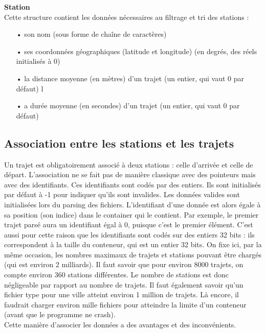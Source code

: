 \documentclass[12pt]{article}
\begin{document}
		\textbf{Station}\\
		Cette structure contient les données nécessaires au filtrage et tri des stations :\\
		\begin{itemize}
			\item[•]son nom (sous forme de chaîne de caractères)
			\item[•]ses coordonnées géographiques (latitude et longitude) (en degrés,
			des réels initialisés à 0)
			\item[•]la distance moyenne (en mètres) d’un trajet (un entier, qui vaut 0 par défaut)
			l\item[•]a durée moyenne (en secondes) d’un trajet (un entier, qui vaut 0 par défaut)
		\end{itemize}
			
		\subsection{Association entre les stations et les trajets}
		Un trajet est obligatoirement associé à deux stations : celle d’arrivée et celle de départ.
	L’association ne se fait pas de manière classique avec des pointeurs mais avec des identifiants. Ces identifiants sont codés par des entiers. Ils sont initialisés par défaut à -1 pour indiquer qu’ils sont invalides. Les données valides sont initialisées lors du parsing des fichiers. L’identifiant d’une donnée est alors égale à sa position (son indice) dans le container qui le contient. Par exemple, le premier trajet parsé aura un identifiant égal à 0, puisque c’est le premier élément. C’est aussi pour cette raison que les identifiants sont codés sur des entiers 32 bits : ils correspondent à la taille du conteneur, qui est un entier 32 bits. On fixe ici, par la même occasion, les nombres maximaux de trajets et stations pouvant être chargés (qui est environ 2 milliards). Il faut savoir que pour environ 8000 trajets, on compte environ 360 stations différentes. Le nombre de stations est donc négligeable par rapport au nombre de trajets. Il faut également savoir qu’un fichier type pour une ville atteint environ 1 million de trajets. Là encore, il faudrait charger environ mille fichiers pour atteindre la limite d’un conteneur (avant que le programme ne crash).\\
	
	Cette manière d’associer les données a des avantages et des inconvénients.\\
			
\end{document}
